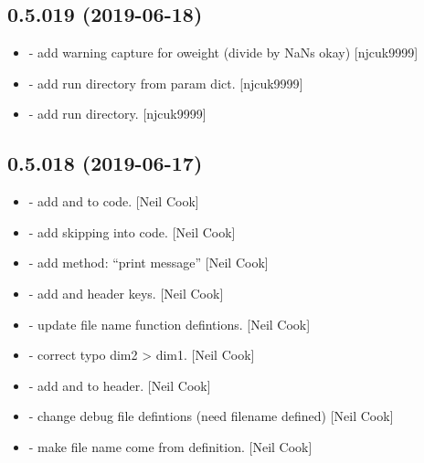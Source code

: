 \documentclass[a4paper,10pt,english]{report}
\begin{document}
\subsection{0.5.019 (2019-06-18)}
\label{\detokenize{misc/changelog:id118}}\begin{itemize}
\item {} 
 - add warning capture for oweight (divide by NaNs okay)
{[}njcuk9999{]}

\item {} 
 - add run directory from param dict. {[}njcuk9999{]}

\item {} 
 - add run directory. {[}njcuk9999{]}

\end{itemize}


\subsection{0.5.018 (2019-06-17)}
\label{\detokenize{misc/changelog:id119}}\begin{itemize}
\item {} 
 - add  and  to code. {[}Neil Cook{]}

\item {} 
 - add skipping into code. {[}Neil Cook{]}

\item {} 
 - add method: “print message” {[}Neil Cook{]}

\item {} 
 - add  and  header keys. {[}Neil Cook{]}

\item {} 
 - update file name function defintions. {[}Neil Cook{]}

\item {} 
 - correct typo dim2 \textendash{}\textgreater{} dim1. {[}Neil Cook{]}

\item {} 
 - add  and  to header. {[}Neil Cook{]}

\item {} 
 - change debug file defintions (need filename
defined) {[}Neil Cook{]}

\item {} 
 - make file name come from definition. {[}Neil
Cook{]}

\end{itemize}
\end{document}
